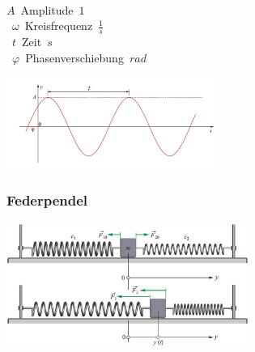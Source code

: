 \begin{center}
	\begin{minipage}{0.25\textwidth}
		 \\
		
		\unit{$A$}{Amplitude}{$1$} \\
		\unit{$\omega$}{Kreisfrequenz}{$\frac{1}{s}$} \\
		\unit{$t$}{Zeit}{$s$} \\
		\unit{$\varphi$}{Phasenverschiebung}{$rad$}
	\end{minipage}%
	\begin{minipage}{0.3\textwidth}
		\includegraphics[height=3cm,keepaspectratio=true]{Images/harmonische_schwingung.png}
	\end{minipage}
\end{center}



\subsubsection{Federpendel}

\begin{center}
	\begin{minipage}{0.2\textwidth}
	\end{minipage}%
	\begin{minipage}{0.3\textwidth}
		\includegraphics[height=4cm,keepaspectratio=true]{Images/federpendel.png}
	\end{minipage}
\end{center}

